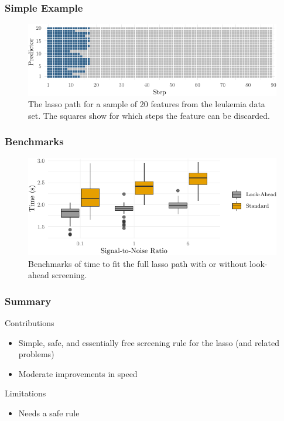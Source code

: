 \documentclass[10pt]{beamer}
\begin{document}
\begin{frame}[c]
  \frametitle{Simple Example}

  \begin{figure}[htpb]
    \centering
    \includegraphics[width=\textwidth]{figures/paper2-casestudy.pdf}
    \caption{%
      The lasso path for a sample of 20 features from the leukemia data set. The squares
      show for which steps the feature can be discarded.
    }
  \end{figure}
\end{frame}

\begin{frame}[c]
  \frametitle{Benchmarks}

  \begin{figure}[htpb]
    \centering
    \includegraphics[width=\textwidth]{figures/paper2-simulated-data.pdf}
    \caption{%
      Benchmarks of time to fit the full lasso path with or without look-ahead screening.
    }
  \end{figure}
\end{frame}

\begin{frame}[c]
  \frametitle{Summary}
  \begin{exampleblock}{Contributions}
    \begin{itemize}
      \item Simple, safe, and essentially free screening rule for the lasso (and related problems)
      \item Moderate improvements in speed
    \end{itemize}
  \end{exampleblock}

  \pause

  \begin{alertblock}{Limitations}
    \begin{itemize}
      \item Needs a safe rule
    \end{itemize}
  \end{alertblock}
\end{frame}
\end{document}
